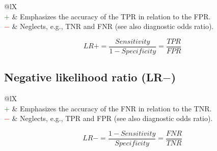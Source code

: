 \documentclass{article}
\begin{document}
\begin{table}[H]\centering
    \begin{tabularx}{\textwidth}{@{}lX}
        \multicolumn{2}{@{}X}{In medicine, LR$+$ describes the probability of, e.g., a positive result in a sick person (true positive) in relation to the probability of a positive result in a healthy person (false positive). (range: $[0, \infty)$)} \\
        \textcolor{Green}{$+$} & Emphasizes the accuracy of the TPR in relation to the FPR. \\
        \textcolor{Red}{$-$}   & Neglects, e.g., TNR and FNR (see also diagnostic odds ratio).
    \end{tabularx}
\end{table}

\begin{equation}
    \textit{LR}+ = \dfrac{\textit{Sensitivity}}{1 - \textit{Specificity}} = \dfrac{\textit{TPR}}{\textit{FPR}}
%
    \label{equation:LR+}
\end{equation}


\subsection[Negative likelihood ratio (LR-)]{Negative likelihood ratio (LR$-$) \cite{swets1973relative, deeks2004diagnostic}}

\begin{table}[H]\centering
    \begin{tabularx}{\textwidth}{@{}lX}
        \multicolumn{2}{@{}X}{In medicine, LR$-$ describes the probability of, e.g., a negative result in a sick person (false negative) in relation to the probability of a negative result in a healthy person (true negative). (range: $[0, \infty)$)} \\
        \textcolor{Green}{$+$} & Emphasizes the accuracy of the FNR in relation to the TNR. \\
        \textcolor{Red}{$-$}   & Neglects, e.g., TPR and FPR (see also diagnostic odds ratio).
    \end{tabularx}
\end{table}

\begin{equation}
    \textit{LR}- = \dfrac{1 - \textit{Sensitivity}}{\textit{Specificity}} = \dfrac{\textit{FNR}}{\textit{TNR}}
%
    \label{equation:LR-}
\end{equation}
\end{document}
